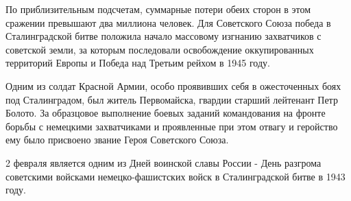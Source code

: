 По приблизительным подсчетам, суммарные потери обеих сторон в этом сражении
превышают два миллиона человек. Для Советского Союза победа в Сталинградской
битве положила начало массовому изгнанию захватчиков с советской земли, за
которым последовали освобождение оккупированных территорий Европы и Победа над
Третьим рейхом в 1945 году.

Одним из солдат Красной Армии, особо проявивших себя в ожесточенных боях под
Сталинградом, был житель Первомайска, гвардии старший лейтенант Петр Болото. За
образцовое выполнение боевых заданий командования на фронте борьбы с немецкими
захватчиками и проявленные при этом отвагу и геройство ему было присвоено
звание Героя Советского Союза.

2 февраля является одним из Дней воинской славы России - День разгрома
советскими войсками немецко-фашистских войск в Сталинградской битве в 1943
году. 
